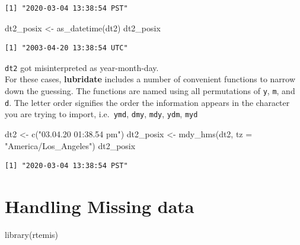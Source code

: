 \documentclass[
]{book}
\newenvironment{Shaded}{\begin{snugshade}}{\end{snugshade}}
\newcommand{\AttributeTok}[1]{\textcolor[rgb]{0.77,0.63,0.00}{#1}}
\newcommand{\FunctionTok}[1]{\textcolor[rgb]{0.00,0.00,0.00}{#1}}
\newcommand{\NormalTok}[1]{#1}
\newcommand{\OtherTok}[1]{\textcolor[rgb]{0.56,0.35,0.01}{#1}}
\newcommand{\StringTok}[1]{\textcolor[rgb]{0.31,0.60,0.02}{#1}}
\begin{document}
\begin{verbatim}
[1] "2020-03-04 13:38:54 PST"
\end{verbatim}

\begin{Shaded}
\begin{Highlighting}[]
\NormalTok{dt2\_posix }\OtherTok{\textless{}{-}} \FunctionTok{as\_datetime}\NormalTok{(dt2)}
\NormalTok{dt2\_posix}
\end{Highlighting}
\end{Shaded}

\begin{verbatim}
[1] "2003-04-20 13:38:54 UTC"
\end{verbatim}

\texttt{dt2} got misinterpreted as year-month-day.\\
For these cases, \textbf{lubridate} includes a number of convenient functions to narrow down the guessing. The functions are named using all permutations of \texttt{y}, \texttt{m}, and \texttt{d}. The letter order signifies the order the information appears in the character you are trying to import, i.e.~\texttt{ymd}, \texttt{dmy}, \texttt{mdy}, \texttt{ydm}, \texttt{myd}

\begin{Shaded}
\begin{Highlighting}[]
\NormalTok{dt2 }\OtherTok{\textless{}{-}} \FunctionTok{c}\NormalTok{(}\StringTok{"03.04.20 01:38.54 pm"}\NormalTok{)}
\NormalTok{dt2\_posix }\OtherTok{\textless{}{-}} \FunctionTok{mdy\_hms}\NormalTok{(dt2, }\AttributeTok{tz =} \StringTok{"America/Los\_Angeles"}\NormalTok{)}
\NormalTok{dt2\_posix}
\end{Highlighting}
\end{Shaded}

\begin{verbatim}
[1] "2020-03-04 13:38:54 PST"
\end{verbatim}

\hypertarget{missingdata}{%
\chapter{Handling Missing data}\label{missingdata}}

\begin{Shaded}
\begin{Highlighting}[]
\FunctionTok{library}\NormalTok{(rtemis)}
\end{Highlighting}
\end{Shaded}
\end{document}
